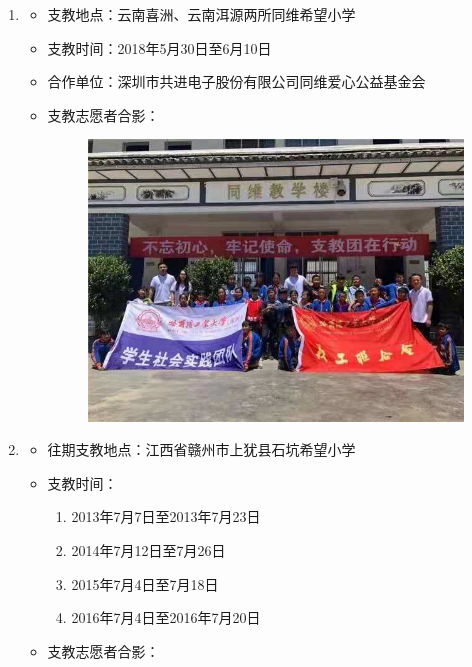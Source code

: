 \begin{enumerate}
\item  \begin{itemize}
\item 支教地点：云南喜洲、云南洱源两所同维希望小学
\item 支教时间：2018年5月30日至6月10日
\item 合作单位：深圳市共进电子股份有限公司同维爱心公益基金会
\item 支教志愿者合影：
\begin{figure}[!ht]
\centering
\includegraphics[width=12cm]{pic/hitsz_2018.jpeg}
\end{figure}
\end{itemize}
\item \begin{itemize}
\item 往期支教地点：江西省赣州市上犹县石坑希望小学
\item 支教时间： \begin{enumerate}
				\item 2013年7月7日至2013年7月23日 
				\item 2014年7月12日至7月26日
				\item 2015年7月4日至7月18日
				\item 2016年7月4日至2016年7月20日
			  \end{enumerate}
\item 支教志愿者合影：
\begin{figure}[!ht]
\centering
  \begin{subfigure}[b]{0.45\textwidth}

\end{subfigure}
\end{figure}
\end{itemize}
\end{enumerate}
